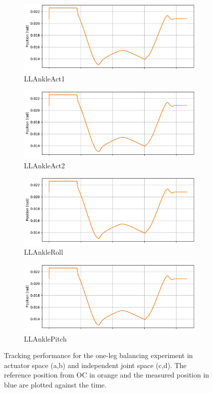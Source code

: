 \begin{figure}[h!]
\begin{subfigure}{.5\textwidth}
	\includegraphics[page=1, width=.95\linewidth]{experiments/balancing/ankleTrack}
	\caption{LLAnkleAct1}	
	\end{subfigure}%
\begin{subfigure}{.5\textwidth}
	\includegraphics[page=2, width=.95\linewidth]{experiments/balancing/ankleTrack}
	\caption{LLAnkleAct2}	
\end{subfigure}%

\begin{subfigure}{.5\textwidth}
	\includegraphics[page=3, width=.95\linewidth]{experiments/balancing/ankleTrack}
	\caption{LLAnkleRoll}	
	\end{subfigure}%
\begin{subfigure}{.5\textwidth}
	\includegraphics[page=4, width=.95\linewidth]{experiments/balancing/ankleTrack}
	\caption{LLAnklePitch}	
\end{subfigure}%
\caption{Tracking performance for the one-leg balancing experiment in actuator space (a,b) and independent joint space (c,d). The reference position from \gls{OC} in orange and the measured position in blue are plotted against the time.}
\label{exp:BalancingTracking}
\end{figure} 
